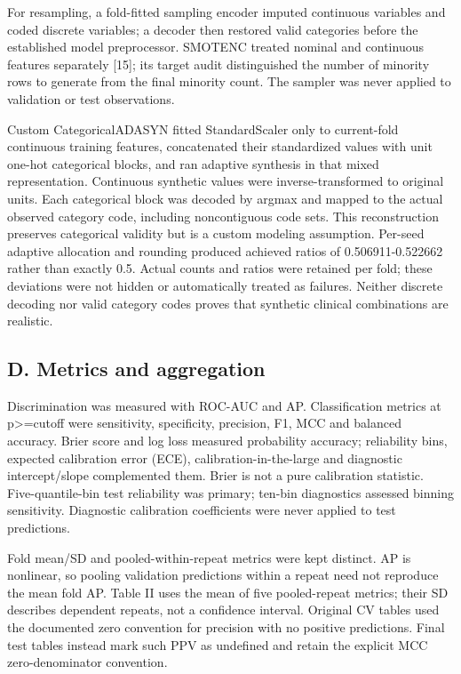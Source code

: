 \documentclass[10pt,twocolumn,letterpaper]{article}
\begin{document}
For resampling, a fold-fitted sampling encoder imputed continuous variables and coded discrete variables; a decoder then restored valid categories before the established model preprocessor. SMOTENC treated nominal and continuous features separately [15]; its target audit distinguished the number of minority rows to generate from the final minority count. The sampler was never applied to validation or test observations.


Custom CategoricalADASYN fitted StandardScaler only to current-fold continuous training features, concatenated their standardized values with unit one-hot categorical blocks, and ran adaptive synthesis in that mixed representation. Continuous synthetic values were inverse-transformed to original units. Each categorical block was decoded by argmax and mapped to the actual observed category code, including noncontiguous code sets. This reconstruction preserves categorical validity but is a custom modeling assumption. Per-seed adaptive allocation and rounding produced achieved ratios of 0.506911-0.522662 rather than exactly 0.5. Actual counts and ratios were retained per fold; these deviations were not hidden or automatically treated as failures. Neither discrete decoding nor valid category codes proves that synthetic clinical combinations are realistic.


\subsection*{D. Metrics and aggregation}
Discrimination was measured with ROC-AUC and AP. Classification metrics at p>=cutoff were sensitivity, specificity, precision, F1, MCC and balanced accuracy. Brier score and log loss measured probability accuracy; reliability bins, expected calibration error (ECE), calibration-in-the-large and diagnostic intercept/slope complemented them. Brier is not a pure calibration statistic. Five-quantile-bin test reliability was primary; ten-bin diagnostics assessed binning sensitivity. Diagnostic calibration coefficients were never applied to test predictions.


Fold mean/SD and pooled-within-repeat metrics were kept distinct. AP is nonlinear, so pooling validation predictions within a repeat need not reproduce the mean fold AP. Table II uses the mean of five pooled-repeat metrics; their SD describes dependent repeats, not a confidence interval. Original CV tables used the documented zero convention for precision with no positive predictions. Final test tables instead mark such PPV as undefined and retain the explicit MCC zero-denominator convention.
\end{document}
